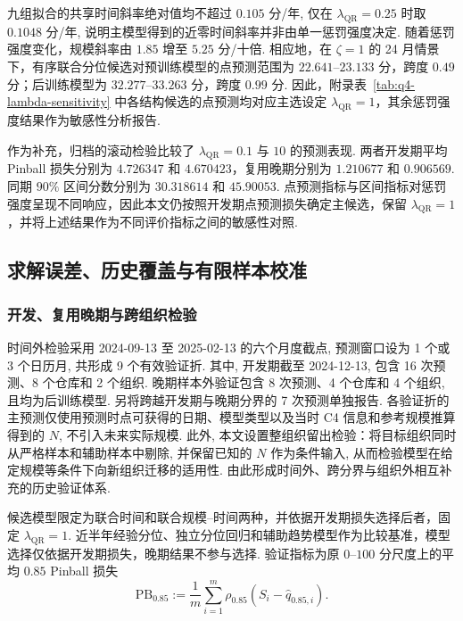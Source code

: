 九组拟合的共享时间斜率绝对值均不超过 $0.105$ 分/年, 仅在 $\lambda_{\mathrm{QR}}=0.25$ 时取 $0.1048$ 分/年, 说明主模型得到的近零时间斜率并非由单一惩罚强度决定. 随着惩罚强度变化，规模斜率由 $1.85$ 增至 $5.25$ 分/十倍. 相应地，在 $\zeta=1$ 的 24 月情景下，有序联合分位候选对预训练模型的点预测范围为 $22.641$--$23.133$ 分，跨度 $0.49$ 分；后训练模型为 $32.277$--$33.263$ 分，跨度 $0.99$ 分. 因此，附录表~\ref{tab:q4-lambda-sensitivity} 中各结构候选的点预测均对应主选设定 $\lambda_{\mathrm{QR}}=1$，其余惩罚强度结果作为敏感性分析报告.

作为补充，归档的滚动检验比较了 $\lambda_{\mathrm{QR}}=0.1$ 与 $10$ 的预测表现. 两者开发期平均 Pinball 损失分别为 $4.726347$ 和 $4.670423$，复用晚期分别为 $1.210677$ 和 $0.906569$. 同期 $90\%$ 区间分数分别为 $30.318614$ 和 $45.90053$. 点预测指标与区间指标对惩罚强度呈现不同响应，因此本文仍按照开发期点预测损失确定主候选，保留 $\lambda_{\mathrm{QR}}=1$，并将上述结果作为不同评价指标之间的敏感性对照.


\subsection{求解误差、历史覆盖与有限样本校准}

\subsubsection{开发、复用晚期与跨组织检验}
时间外检验采用 2024-09-13 至 2025-02-13 的六个月度截点, 预测窗口设为 1 个或 3 个日历月, 共形成 9 个有效验证折. 其中, 开发期截至 2024-12-13, 包含 16 次预测、8 个仓库和 2 个组织. 晚期样本外验证包含 8 次预测、4 个仓库和 4 个组织, 且均为后训练模型. 另将跨越开发期与晚期分界的 7 次预测单独报告. 各验证折的主预测仅使用预测时点可获得的日期、模型类型以及当时 C4 信息和参考规模推算得到的 $N$, 不引入未来实际规模. 此外, 本文设置整组织留出检验：将目标组织同时从严格样本和辅助样本中剔除, 并保留已知的 $N$ 作为条件输入, 从而检验模型在给定规模等条件下向新组织迁移的适用性. 由此形成时间外、跨分界与组织外相互补充的历史验证体系.

候选模型限定为联合时间和联合规模--时间两种，并依据开发期损失选择后者，固定 $\lambda_{\mathrm{QR}}=1$. 近半年经验分位、独立分位回归和辅助趋势模型作为比较基准，模型选择仅依据开发期损失，晚期结果不参与选择. 验证指标为原 $0$--$100$ 分尺度上的平均 $0.85$ Pinball 损失
\begin{equation}\label{eq:q4-validation-pinball-v26}
\mathrm{PB}_{0.85}:=\frac1m\sum_{i=1}^m
\rho_{0.85}(S_i-\widehat q_{0.85,i}).
\end{equation}

